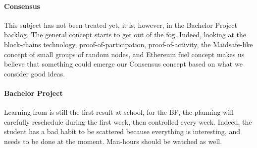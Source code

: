 \paragraph{Consensus}
This subject has not been treated yet, it is, however, in the Bachelor Project backlog. The general concept starts to get out of the fog. Indeed, looking at the block-chains technology, proof-of-participation, proof-of-activity, the Maidsafe-like concept of small groups of random nodes, and Ethereum fuel concept makes us believe that something could emerge our Consensus concept based on what we consider good ideas.

\paragraph{Bachelor Project}
Learning from is still the first result at school, for the BP, the planning will carefully reschedule during the first week, then controlled every week. Indeed, the student has a bad habit to be scattered because everything is interesting, and needs to be done at the moment. Man-hours should be watched as well.


